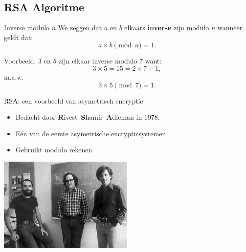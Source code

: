 \documentclass{beamer}
\begin{document}




\subsection{RSA Algoritme}
\sectionframe

%	
%	
%	

\begin{frame}{Inverse modulo $n$}
We zeggen dat $a$ en $b$ elkaars \textbf{inverse} zijn modulo $n$ wanneer geldt dat:
\[
a \times b \pmod{n} = 1.
\]

\vspace{0.5cm}
Voorbeeld: $3$ en $5$ zijn elkaar inverse modulo 7 want:
\[
3 \times 5 = 15 = 2\times 7 + 1,
\]
m.a.w.
\[
3 \times 5  \pmod{7} = 1.
\]
\end{frame}

\begin{frame}{RSA: een voorbeeld van asymetrisch encryptie}
\begin{itemize}
	\item Bedacht door \textbf{R}ivest–\textbf{S}hamir–\textbf{A}dleman in 1978.
	\item E\'en van de eerste asymetrische encryptiesystemen.
	\item Gebruikt modulo rekenen.
\end{itemize}

\begin{center}
\includegraphics[width=0.5\textwidth]{img/rivest-shamir-adleman.jpg}
\end{center}
\end{frame}
\end{document}
